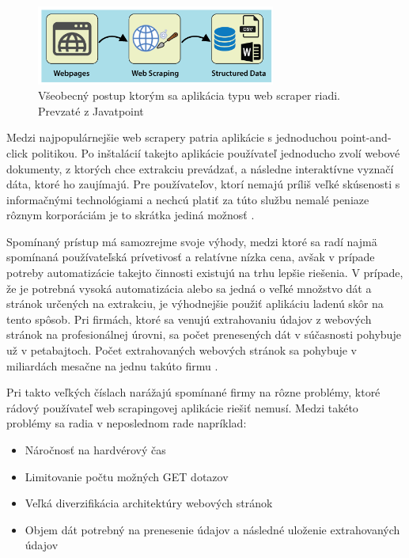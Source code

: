 \begin{figure}[hbt]
	\centering
	\includegraphics[width=0.7\textwidth]{obrazky-figures/web-scraping-using-python.png}
	\caption{Všeobecný postup ktorým sa aplikácia typu web scraper riadi. Prevzaté z Javatpoint \cite{WebScrap}}
	\label{WebScrap_img}
\end{figure}

\bigskip

Medzi najpopulárnejšie web scrapery patria aplikácie s jednoduchou point-and-click politikou. Po inštalácií takejto aplikácie používateľ jednoducho zvolí webové dokumenty, z ktorých chce extrakciu prevádzať, a následne interaktívne vyznačí dáta, ktoré ho zaujímajú. Pre používateľov, ktorí nemajú príliš veľké skúsenosti s informačnými technológiami a nechcú platiť za túto službu nemalé peniaze rôznym korporáciám je to skrátka jediná možnosť \cite{scrapers}.

\bigskip

Spomínaný prístup má samozrejme svoje výhody, medzi ktoré sa radí najmä spomínaná používateľská prívetivosť a relatívne nízka cena, avšak v prípade potreby automatizácie takejto činnosti existujú na trhu lepšie riešenia. V prípade, že je potrebná vysoká automatizácia alebo sa jedná o veľké množstvo dát a stránok určených na extrakciu, je výhodnejšie použiť aplikáciu ladenú skôr na tento spôsob. Pri firmách, ktoré sa venujú extrahovaniu údajov z webových stránok na profesionálnej úrovni, sa počet prenesených dát v súčasnosti pohybuje už v petabajtoch. Počet extrahovaných webových stránok sa pohybuje v miliardách mesačne na jednu takúto firmu \cite{JanCurna:online}.

Pri takto veľkých číslach narážajú spomínané firmy na rôzne problémy, ktoré rádový používateľ web scrapingovej aplikácie riešiť nemusí. Medzi takéto problémy sa radia v neposlednom rade napríklad:
\begin{itemize}
    \item {Náročnosť na hardvérový čas}
    \item {Limitovanie počtu možných GET dotazov}
    \item {Veľká diverzifikácia architektúry webových stránok}
    \item {Objem dát potrebný na prenesenie údajov a následné uloženie extrahovaných údajov}
\end{itemize}

